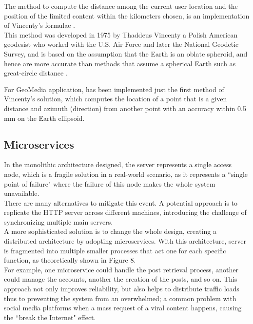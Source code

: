 \documentclass[conference]{IEEEtran}
\begin{document}
The method to compute the distance among the current user location and the position of the limited content within the kilometers chosen, is an implementation of Vincenty's formulae \cite{Vincenty}.
\\
This method was developed in 1975 by Thaddeus Vincenty \cite{ThaddeusVincenty} a Polish American geodesist who worked with the U.S. Air Force and later the National Geodetic Survey, and is based on the assumption that the Earth is an oblate spheroid, and hence are more accurate than methods that assume a spherical Earth such as great-circle distance \cite{GCDWiki}. 

For GeoMedia application, has been implemented just the first method of Vincenty's solution, which computes the location of a point that is a given distance and azimuth (direction) from another point with an accuracy within 0.5 mm on the Earth ellipsoid.


\subsection{Microservices}
In the monolithic architecture designed, the server represents a single access node, which is a fragile solution in a real-world scenario, as it represents a ``single point of failure" where the failure of this node makes the whole system unavailable.
\\
There are many alternatives to mitigate this event. A potential approach is to replicate the HTTP server across different machines, introducing the challenge of synchronizing multiple main servers.
\\
A more sophisticated solution is to change the whole design, creating a distributed architecture by adopting microservices\cite{b6}. With this architecture, server is fragmented into multiple smaller processes that act one for each specific function, as theoretically shown in Figure 8.
\\
For example, one microservice could handle the post retrieval process, another could manage the accounts, another the creation of the posts, and so on. This approach not only improves reliability, but also helps to distribute traffic loads thus to preventing the system from an overwhelmed; a common problem with social media platforms when a mass request of a viral content happens, causing the ``break the Internet" \cite{BreakTheInternet} effect.
\end{document}
